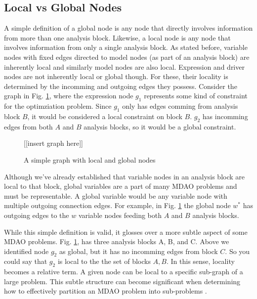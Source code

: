 \subsection{Local vs Global Nodes}
	\label{ss:local vs global}
	A simple definition of a global node is any node that directly involves information 
	from more than one analysis block. Likewise, a local node is any node 
	that involves information from only a single analysis block. As stated before, variable 
	nodes with fixed edges directed to model nodes (as part of an analysis block) are inherently local 
	and similarly model nodes are also local. Expression and driver nodes
	are not inherently local or global though. For these, their locality is determined 
	by the incomming and outgoing edges they possess. Consider the graph in Fig. \ref{f:local_global}, 
	where the expression node $g_1$ represents some kind of constraint for the optimziation problem. 
	Since $g_1$ only has edges comming from analysis block $B$, it would be considered a local constraint 
	on block $B$. $g_2$ has incomming edges from both $A$ and $B$ analysis blocks, so it would be a global constraint. 
	\begin{figure}
	  \begin{center}
	  [[insert graph here]]
	  \caption{A simple graph with local and global nodes \label{f:local_global}}
	  \end{center}
	\end{figure}

	Although we've already established that variable nodes in an analysis block are local to that 
	block, global variables are a part of many MDAO problems and must be representable. A global variable 
	would be any variable node with multiple outgoing connection edges. 
	For example, in Fig. \ref{f:local_global} the global node $w^*$ has outgoing edges to 
	the $w$ variable nodes feeding both $A$ and $B$ analysis blocks.

	While this simple definition is valid, it glosses over a more subtle aspect of 
	some MDAO problems. Fig. \ref{f:local_global}, has three analysis 
	blocks A, B, and C. Above we identified node $g_2$ as global,  but
	it has no incomming edges from block $C$. So you could say that $g_2$ is 
	local to the the set of blocks $A,B$. In this sense, locality 
	becomes a relative term. A given node can be local to a specific sub-graph of a large
	problem. This subtle structure can become significant when determining how to 
	effectively partition an MDAO problem into sub-problems 
	\cite{krishnamachari1997optimal,allison2009optimal,michelena1997hypergraph}.

